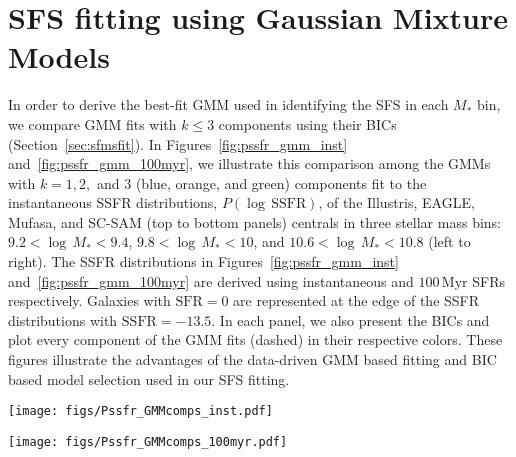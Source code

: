 \documentclass[preprint2,tighten]{aastex62}
\begin{document}
\section{SFS fitting using Gaussian Mixture Models} \label{app:gmm_pssfr}
{\color{red}
In order to derive the best-fit GMM used in identifying the SFS in 
each $M_*$ bin, we compare GMM fits with $k\leq 3$ components using
their BICs (Section~\ref{sec:sfmsfit}). In Figures~\ref{fig:pssfr_gmm_inst} 
and~\ref{fig:pssfr_gmm_100myr}, we illustrate this comparison among the  
GMMs with $k=1, 2,$ and $3$ (blue, orange, and green) components fit
to the instantaneous SSFR distributions, $P(\log\,\mathrm{SSFR})$, of the 
Illustris, EAGLE, {\sc Mufasa}, and SC-SAM (top to bottom panels) centrals 
in three stellar mass bins: 
$9.2 <\log\,M_*<9.4$, $9.8 <\log\,M_*<10$, and $10.6 <\log\,M_*<10.8$ (left to right). 
The SSFR distributions in Figures~\ref{fig:pssfr_gmm_inst} 
and~\ref{fig:pssfr_gmm_100myr} are derived using instantaneous and 
$100\,\mathrm{Myr}$ SFRs respectively. Galaxies with $\mathrm{SFR}=0$
are represented at the edge of the SSFR distributions with $\mathrm{SSFR}=-13.5$.
In each panel, we also present the BICs and plot every component of the 
GMM fits (dashed) in their respective colors. These figures illustrate
the advantages of the data-driven GMM based fitting and BIC based
model selection used in our SFS fitting.

\begin{figure*}
\begin{center}
\texttt{[image: figs/Pssfr\_GMMcomps\_inst.pdf]} 
\caption{GMMs with $k=1, 2,$ and $3$ (blue, orange, and green) components fit
to the instantaneous SSFR distributions, $P(\log\,\mathrm{SSFR})$, of the 
Illustris, EAGLE, {\sc Mufasa}, and SC-SAM (top to bottom panels) centrals 
in three stellar mass bins: $[9.2, 9.4]$, $[9.8, 10.]$, and $[10.6, 10.8]$ 
(left to right). For every GMM fit, we plot each component in dash lines 
and list their BICs in the same color. In our SFS fitting, we select the 
GMM with the lowest BIC as the best-fit. This provides a \emph{data-driven 
way of accurately fitting the SSFR distribution while also avoiding 
overfitting}.
} 
\label{fig:pssfr_gmm_inst}
\end{center}
\end{figure*}
\begin{figure*}
\begin{center}
\texttt{[image: figs/Pssfr\_GMMcomps\_100myr.pdf]} 
\caption{Same as Figure~\ref{fig:pssfr_gmm_inst} but for the $100\,\mathrm{Myr}$
SSFR distributions.} 
\label{fig:pssfr_gmm_100myr}
\end{center}
\end{figure*}


}
\end{document}
